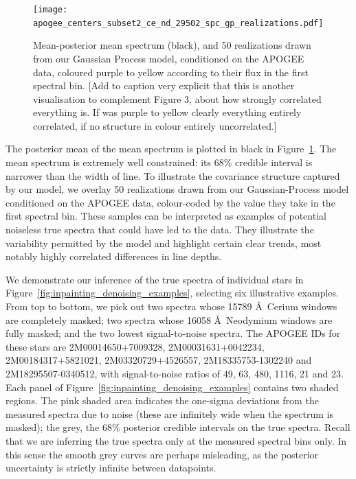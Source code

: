 \documentclass[a4paper,fleqn,usenatbib]{mnras}
\begin{document}
\begin{figure}
	\texttt{[image: apogee\_centers\_subset2\_ce\_nd\_29502\_spc\_gp\_realizations.pdf]}
    \caption{Mean-posterior mean spectrum (black), and 50 realizations drawn from our Gaussian Process model, conditioned on the APOGEE data, coloured purple to yellow according to their flux in the first spectral bin. [Add to caption very explicit that this is another visualisation to complement Figure 3, about how strongly correlated everything is. If was purple to yellow clearly everything entirely correlated, if no structure in colour entirely uncorrelated.]  }
    \label{fig:gp_reals}
\end{figure}

The posterior mean of the mean spectrum is plotted in black in Figure~\ref{fig:gp_reals}. The mean spectrum is extremely well constrained: its 68\% credible interval is narrower than the width of line. To illustrate the covariance structure captured by our model, we overlay 50 realizations drawn from our Gaussian-Process model conditioned on the APOGEE data, colour-coded by the value they take in the first spectral bin. These samples can be interpreted as examples of potential noiseless true spectra that could have led to the data. They illustrate the variability permitted by the model and highlight certain clear trends, most notably highly correlated differences in line depths.

We demonstrate our inference of the true spectra of individual stars in Figure~\ref{fig:inpainting_denoising_examples}, selecting six illustrative examples. From top to bottom, we pick out two spectra whose 15789 \AA\ Cerium windows are completely masked; two spectra whose 16058 \AA\ Neodymium windows are fully masked; and the two lowest signal-to-noise spectra. The APOGEE IDs for these stars are 2M00014650+7009328, 2M00031631+0042234, 2M00184317+5821021, 2M03320729+4526557, 2M18335753-1302240 and 2M18295507-0340512, with signal-to-noise ratios of 49, 63, 480, 1116, 21 and 23. Each panel of Figure~\ref{fig:inpainting_denoising_examples} contains two shaded regions. The pink shaded area indicates the one-sigma deviations from the measured spectra due to noise (these are infinitely wide when the spectrum is masked); the grey, the 68\% posterior credible intervals on the true spectra. Recall that we are inferring the true spectra only at the measured spectral bins only. In this sense the smooth grey curves are perhaps misleading, as the posterior uncertainty is strictly infinite between datapoints.
 
\end{document}
